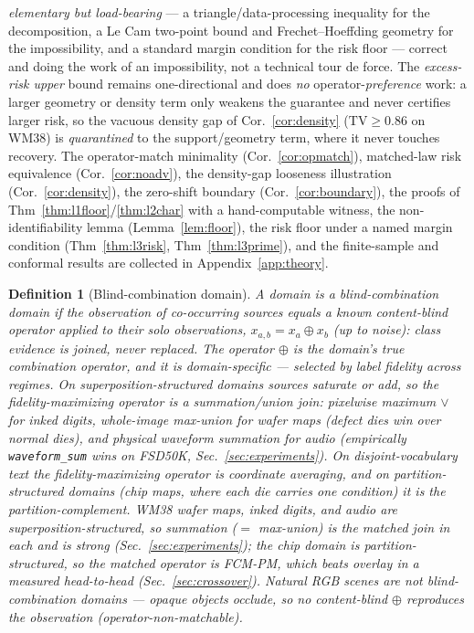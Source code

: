 \documentclass[11pt]{article}
\newtheorem{definition}{Definition}
\begin{document}
\emph{elementary but load-bearing} --- a triangle/data-processing inequality for the
decomposition, a Le Cam two-point bound and Frechet--Hoeffding geometry for the impossibility,
and a standard margin condition for the risk floor --- correct and doing the work of an
impossibility, not a technical tour de force. The \emph{excess-risk upper} bound remains
one-directional and does \emph{no} operator-\emph{preference} work: a larger geometry or density
term only weakens the guarantee and never certifies larger risk, so the vacuous density gap of
Cor.~\ref{cor:density} ($\mathrm{TV}\ge0.86$ on WM38) is \emph{quarantined} to the
support/geometry term, where it never touches recovery. The operator-match minimality
(Cor.~\ref{cor:opmatch}), matched-law risk equivalence (Cor.~\ref{cor:noadv}), the density-gap
looseness illustration (Cor.~\ref{cor:density}), the zero-shift boundary (Cor.~\ref{cor:boundary}),
the proofs of Thm~\ref{thm:l1floor}/\ref{thm:l2char} with a hand-computable witness, the
non-identifiability lemma (Lemma~\ref{lem:floor}), the risk floor under a named margin condition
(Thm~\ref{thm:l3risk}, Thm~\ref{thm:l3prime}), and the finite-sample and conformal results are
collected in Appendix~\ref{app:theory}.

\begin{definition}[Blind-combination domain]\label{def:blindcomb}
A domain is a blind-combination domain if the observation of co-occurring
sources equals a known content-blind operator applied to their solo
observations, $x_{a,b} = x_a \oplus x_b$ (up to noise): class evidence is joined,
never replaced. The operator $\oplus$ is the domain's \emph{true combination
operator}, and it is domain-specific --- selected by label fidelity across
regimes. On \emph{superposition-structured} domains sources saturate or add, so the
fidelity-maximizing operator is a \emph{summation/union} join: pixelwise maximum
$\vee$ for inked digits, whole-image max-union for wafer maps (defect dies win over
normal dies), and physical waveform summation for audio (empirically
\texttt{waveform\_sum} wins on FSD50K, Sec.~\ref{sec:experiments}). On
disjoint-vocabulary text the fidelity-maximizing operator is coordinate averaging, and
on \emph{partition-structured} domains (chip maps, where each die carries one
condition) it is the partition-complement. WM38 wafer maps, inked digits, and audio are
superposition-structured, so summation ($=$ max-union) is the matched join in each and
is strong (Sec.~\ref{sec:experiments}); the chip domain is partition-structured, so the
matched operator is FCM-PM, which beats overlay in a measured head-to-head
(Sec.~\ref{sec:crossover}). Natural RGB scenes are not blind-combination domains ---
opaque objects occlude, so no content-blind $\oplus$ reproduces the observation
(operator-\emph{non}-matchable).
\end{definition}
\end{document}
